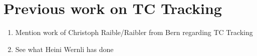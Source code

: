 \section{Previous work on TC Tracking}\label{sec:tracking}
\begin{enumerate}
\item Mention work of Christoph Raible/Raibler from Bern regarding TC Tracking
\item See what Heini Wernli has done
\end{enumerate}